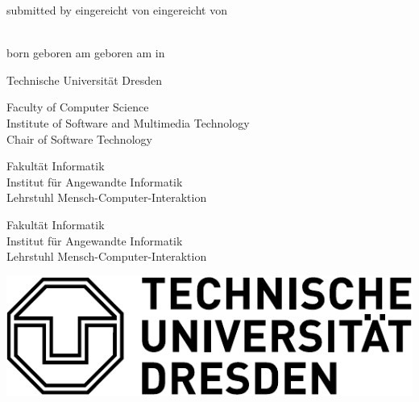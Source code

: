 
\begin{titlepage}

\begin{center}

	{\large
		\doctype\relax
	}
	
	\vspace{.5cm}
	
	{\huge \bfseries \sffamily
		\doctitle\relax
		\par
	}
	
	\vspace{1cm}
	
	\ifx\doclanguage\english
		submitted by
	\fi
	\ifx\doclanguage\german
		eingereicht von
	\fi
	\ifx\doclanguage\ngerman
		eingereicht von
	\fi
	
	\vspace{.5cm}
	
	\textbf{\authorname} \\
	\ifx\doclanguage\english
		born
	\fi
	\ifx\doclanguage\german
		geboren am
	\fi
	\ifx\doclanguage\ngerman
		geboren am
	\fi
	\authorbirthday{} in \authorbirthplace

	
	\vspace{1.5cm}
	
	{\Large Technische Universität Dresden}
	
	\vspace{.5cm}
	
	\ifx\doclanguage\english
		Faculty of Computer Science \\
		Institute of Software and Multimedia Technology \\
		Chair of Software Technology

	\fi
	\ifx\doclanguage\german
		Fakultät Informatik \\
		Institut für Angewandte Informatik \\
		Lehrstuhl Mensch-Computer-Interaktion

	\fi
	\ifx\doclanguage\ngerman
		Fakultät Informatik \\
		Institut für Angewandte Informatik \\
		Lehrstuhl Mensch-Computer-Interaktion

	\fi
	
	\vspace{1.0cm}
	
	\includegraphics[scale=.75]{includes/figures/tu_logo}
	

\end{center}
\end{titlepage}
